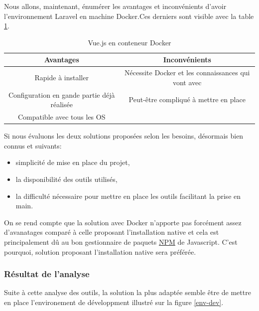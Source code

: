 \documentclass[
    iai, %
    il, %
]{heig-tb}
\begin{document}
Nous allons, maintenant, énumérer les avantages et inconvénients d'avoir l'environnement Laravel en
machine Docker.Ces derniers sont visible avec la table \ref{dev-vuejs-docker}.

\begin{table}[h]
    \begin{center}
        \caption{Vue.js en conteneur Docker \label{dev-vuejs-docker}}
        \begin{tabular}{c|c}
            Avantages                                   & Inconvénients                                       \\ \hline
            Rapide à installer                          & Nécessite Docker et les connaissances qui vont avec \\
            Configuration en gande partie déjà réalisée & Peut-être compliqué à mettre en place               \\
            Compatible avec tous les OS                 &                                                     \\
        \end{tabular}
    \end{center}
\end{table}

Si nous évaluons les deux solutions proposées selon les besoins, désormais bien connus et suivants:
\begin{itemize}
    \item simplicité de mise en place du projet,
    \item la disponibilité des outils utilisés,
    \item la difficulté nécessaire pour mettre en place les outils facilitant la prise en main.
\end{itemize}

On se rend compte que la solution avec Docker n'apporte pas forcément assez d'avanatages comparé à celle proposant l'installation native et cela est principalement dû au bon gestionnaire de paquets \href{https://www.npmjs.com/}{NPM} de Javascript. C'est pourquoi, solution proposant l'installation native sera préférée.

\subsubsection{Résultat de l'analyse}
Suite à cette analyse des outils, la solution la plus adaptée semble être de mettre en place
l'environement de développment illustré sur la figure \ref{env-dev}.
\end{document}
